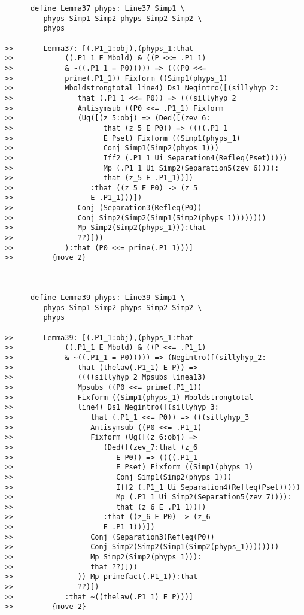 \documentclass[12pt]{article}
\begin{document}
\begin{verbatim}
      define Lemma37 phyps: Line37 Simp1 \
         phyps Simp1 Simp2 phyps Simp2 Simp2 \
         phyps

>>       Lemma37: [(.P1_1:obj),(phyps_1:that
>>            ((.P1_1 E Mbold) & ((P <<= .P1_1)
>>            & ~((.P1_1 = P0))))) => (((P0 <<=
>>            prime(.P1_1)) Fixform ((Simp1(phyps_1)
>>            Mboldstrongtotal line4) Ds1 Negintro([(sillyhyp_2:
>>               that (.P1_1 <<= P0)) => (((sillyhyp_2
>>               Antisymsub ((P0 <<= .P1_1) Fixform
>>               (Ug([(z_5:obj) => (Ded([(zev_6:
>>                     that (z_5 E P0)) => ((((.P1_1
>>                     E Pset) Fixform ((Simp1(phyps_1)
>>                     Conj Simp1(Simp2(phyps_1)))
>>                     Iff2 (.P1_1 Ui Separation4(Refleq(Pset)))))
>>                     Mp (.P1_1 Ui Simp2(Separation5(zev_6)))):
>>                     that (z_5 E .P1_1))])
>>                  :that ((z_5 E P0) -> (z_5
>>                  E .P1_1)))])
>>               Conj (Separation3(Refleq(P0))
>>               Conj Simp2(Simp2(Simp1(Simp2(phyps_1))))))))
>>               Mp Simp2(Simp2(phyps_1))):that
>>               ??)]))
>>            ):that (P0 <<= prime(.P1_1)))]
>>         {move 2}



      define Lemma39 phyps: Line39 Simp1 \
         phyps Simp1 Simp2 phyps Simp2 Simp2 \
         phyps

>>       Lemma39: [(.P1_1:obj),(phyps_1:that
>>            ((.P1_1 E Mbold) & ((P <<= .P1_1)
>>            & ~((.P1_1 = P0))))) => (Negintro([(sillyhyp_2:
>>               that (thelaw(.P1_1) E P)) =>
>>               ((((sillyhyp_2 Mpsubs linea13)
>>               Mpsubs ((P0 <<= prime(.P1_1))
>>               Fixform ((Simp1(phyps_1) Mboldstrongtotal
>>               line4) Ds1 Negintro([(sillyhyp_3:
>>                  that (.P1_1 <<= P0)) => (((sillyhyp_3
>>                  Antisymsub ((P0 <<= .P1_1)
>>                  Fixform (Ug([(z_6:obj) =>
>>                     (Ded([(zev_7:that (z_6
>>                        E P0)) => ((((.P1_1
>>                        E Pset) Fixform ((Simp1(phyps_1)
>>                        Conj Simp1(Simp2(phyps_1)))
>>                        Iff2 (.P1_1 Ui Separation4(Refleq(Pset)))))
>>                        Mp (.P1_1 Ui Simp2(Separation5(zev_7)))):
>>                        that (z_6 E .P1_1))])
>>                     :that ((z_6 E P0) -> (z_6
>>                     E .P1_1)))])
>>                  Conj (Separation3(Refleq(P0))
>>                  Conj Simp2(Simp2(Simp1(Simp2(phyps_1))))))))
>>                  Mp Simp2(Simp2(phyps_1))):
>>                  that ??)]))
>>               )) Mp primefact(.P1_1)):that
>>               ??)])
>>            :that ~((thelaw(.P1_1) E P)))]
>>         {move 2}




\end{verbatim}
\end{document}

